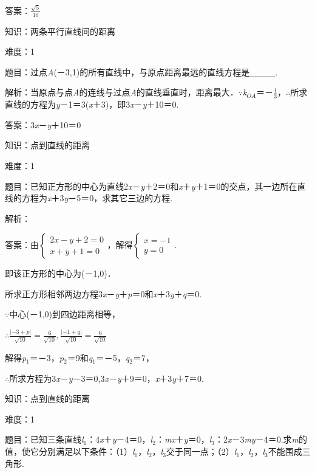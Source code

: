 \documentclass{article} %
\begin{document}
答案：$\frac{\sqrt{5}}{10}$

知识：两条平行直线间的距离

难度：1

题目：过点\textit{A}(－3,1)的所有直线中，与原点距离最远的直线方程是\_\_\_\_.

解析：当原点与点\textit{A}的连线与过点\textit{A}的直线垂直时，距离最大．$\mathrm{\because}$\textit{k${}_{OA}$}＝－$\frac{1}{3}$，$\mathrm{\therefore}$所求直线的方程为\textit{y}－1＝3(\textit{x}＋3)，即3\textit{x}－\textit{y}＋10＝0.

答案：3\textit{x}－\textit{y}＋10＝0

知识：点到直线的距离

难度：1

题目：已知正方形的中心为直线2\textit{x}－\textit{y}＋2＝0和\textit{x}＋\textit{y}＋1＝0的交点，其一边所在直线的方程为\textit{x}＋3\textit{y}－5＝0，求其它三边的方程.

解析：

答案：由$\left\{\begin{array}{l} 2x-y+2=0\\ x+y+1=0 \end{array}\right.$，解得$\left\{\begin{array}{l} x=-1\\ y=0 \end{array}\right.$.

即该正方形的中心为(－1,0)．

所求正方形相邻两边方程3\textit{x}－\textit{y}＋\textit{p}＝0和\textit{x}＋3\textit{y}＋\textit{q}＝0.

$\mathrm{\because}$中心(－1,0)到四边距离相等，

$\mathrm{\therefore}\frac{|-3+p|}{\sqrt{10}}=\frac{6}{\sqrt{10}}, \frac{|-1+q|}{\sqrt{10}}=\frac{6}{\sqrt{10}}$

解得\textit{p}${}_{1}$＝－3，\textit{p}${}_{2}$＝9和\textit{q}${}_{1}$＝－5，\textit{q}${}_{2}$＝7，

$\mathrm{\therefore}$所求方程为3\textit{x}－\textit{y}－3＝0,3\textit{x}－\textit{y}＋9＝0，\textit{x}＋3\textit{y}＋7＝0.

知识：点到直线的距离

难度：1

题目：已知三条直线\textit{l}${}_{1}$：4\textit{x}＋\textit{y}－4＝0，\textit{l}${}_{2}$：\textit{mx}＋\textit{y}＝0，\textit{l}${}_{3}$：2\textit{x}－3\textit{my}－4＝0.求\textit{m}的值，使它分别满足以下条件：（1）\textit{l}${}_{1}$，\textit{l}${}_{2}$，\textit{l}${}_{3}$交于同一点；（2）\textit{l}${}_{1}$，\textit{l}${}_{2}$，\textit{l}${}_{3}$不能围成三角形.
\end{document}
